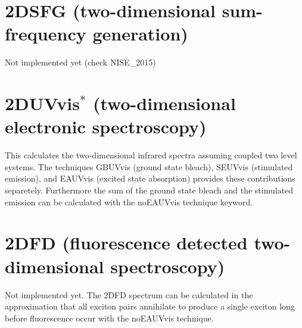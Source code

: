 \section{2DSFG (two-dimensional sum-frequency generation)}
 Not implemented yet (check NISE\_2015)
\section{2DUVvis$^{*}$ (two-dimensional electronic spectroscopy)}
This calculates the two-dimensional infrared spectra assuming coupled two level systems. The techniques GBUVvis (ground state bleach), SEUVvis (stimulated emission), and EAUVvis (excited state absorption) provides these contributions separetely. Furthermore the sum of the ground state bleach and the stimulated emission can be calculated with the noEAUVvis technique keyword. 
\section{2DFD (fluorescence detected two-dimensional spectroscopy)}
 Not implemented yet. The 2DFD spectrum can be calculated in the approximation that all exciton pairs annihilate to produce a single exciton long before fluorescence occur with the noEAUVvis technique.
